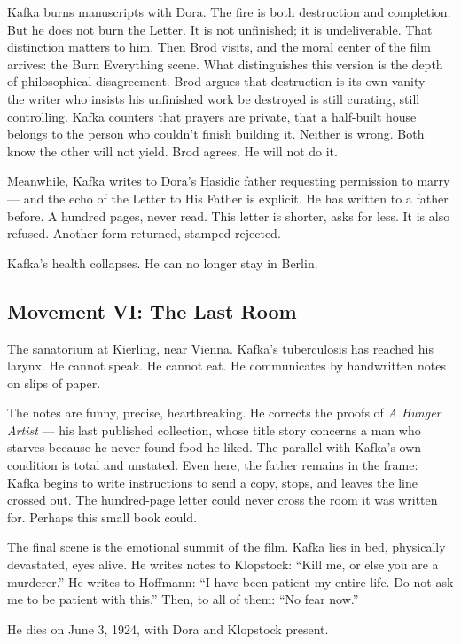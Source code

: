 Kafka burns manuscripts with Dora. The fire is both destruction and completion. But he does not burn the Letter. It is not unfinished; it is undeliverable. That distinction matters to him. Then Brod visits, and the moral center of the film arrives: the Burn Everything scene. What distinguishes this version is the depth of philosophical disagreement. Brod argues that destruction is its own vanity --- the writer who insists his unfinished work be destroyed is still curating, still controlling. Kafka counters that prayers are private, that a half-built house belongs to the person who couldn't finish building it. Neither is wrong. Both know the other will not yield. Brod agrees. He will not do it.

Meanwhile, Kafka writes to Dora's Hasidic father requesting permission to marry --- and the echo of the Letter to His Father is explicit. He has written to a father before. A hundred pages, never read. This letter is shorter, asks for less. It is also refused. Another form returned, stamped rejected.

Kafka's health collapses. He can no longer stay in Berlin.

\subsection{Movement VI: The Last Room}

The sanatorium at Kierling, near Vienna. Kafka's tuberculosis has reached his larynx. He cannot speak. He cannot eat. He communicates by handwritten notes on slips of paper.

The notes are funny, precise, heartbreaking. He corrects the proofs of \textit{A Hunger Artist} --- his last published collection, whose title story concerns a man who starves because he never found food he liked. The parallel with Kafka's own condition is total and unstated. Even here, the father remains in the frame: Kafka begins to write instructions to send a copy, stops, and leaves the line crossed out. The hundred-page letter could never cross the room it was written for. Perhaps this small book could.

The final scene is the emotional summit of the film. Kafka lies in bed, physically devastated, eyes alive. He writes notes to Klopstock: ``Kill me, or else you are a murderer.'' He writes to Hoffmann: ``I have been patient my entire life. Do not ask me to be patient with this.'' Then, to all of them: ``No fear now.''

He dies on June 3, 1924, with Dora and Klopstock present.

